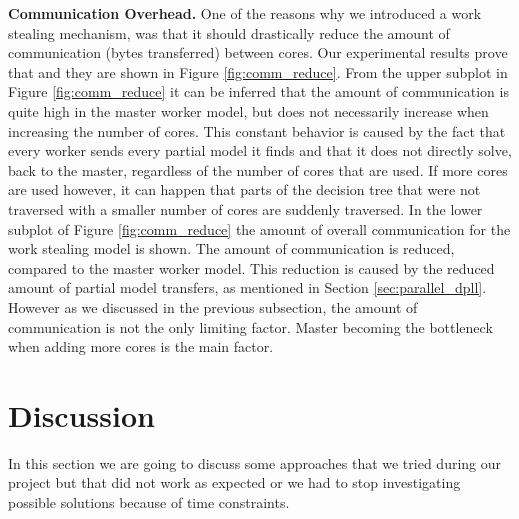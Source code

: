 \documentclass[letterpaper]{article}
\newcommand{\mypar}[1]{{\bf #1.}}
\begin{document}
\mypar{Communication Overhead}
One of the reasons why we introduced a work stealing mechanism,
was that it should drastically reduce the amount of communication (bytes transferred) between cores.
Our experimental results prove that and they are shown in Figure \ref{fig:comm_reduce}.
From the upper subplot in Figure \ref{fig:comm_reduce} it can be inferred that the amount of communication is quite high in the master worker model,
but does not necessarily increase when increasing the number of cores.
This constant behavior is caused by the fact that every worker sends every partial model it finds and that it does not directly solve, back to the master,
regardless of the number of cores that are used.
If more cores are used however, it can happen that parts of the decision tree that were not traversed with a smaller number of cores are suddenly traversed.
In the lower subplot of Figure \ref{fig:comm_reduce} the amount of overall communication for the work stealing model is shown.
The amount of communication is reduced, compared to the master worker model.
This reduction is caused by the reduced amount of partial model transfers, as mentioned in Section \ref{sec:parallel_dpll}.
However as we discussed in the previous subsection, the amount of communication is not the only limiting factor.
Master becoming the bottleneck when adding more cores is the main factor.

\section{Discussion}\label{sec:discussion}
In this section we are going to discuss some approaches that we tried during our project but that did not work as expected or we had to stop investigating possible solutions because of time constraints.
\end{document}
